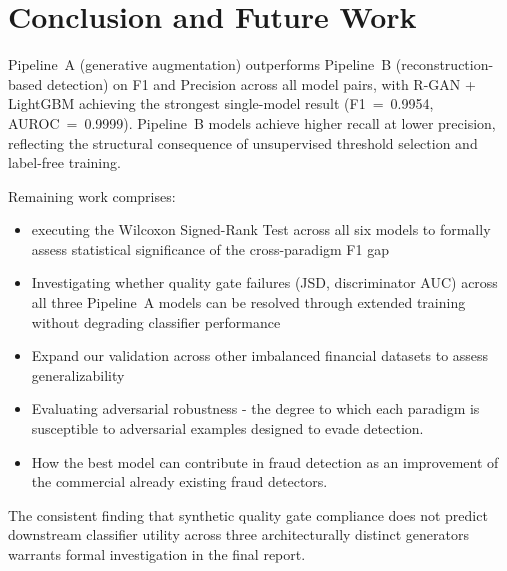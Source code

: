 \documentclass[conference]{IEEEtran}
\begin{document}
\section{Conclusion and Future Work}

Pipeline~A (generative
augmentation) outperforms Pipeline~B (reconstruction-based detection)
on F1 and Precision across all model pairs, with R-GAN + LightGBM
achieving the strongest single-model result (F1~=~0.9954, AUROC~=~0.9999).
Pipeline~B models achieve higher recall at lower precision, reflecting
the structural consequence of unsupervised threshold selection and
label-free training.

\noindent Remaining work comprises:
\begin{itemize}
    \item[-] executing the Wilcoxon Signed-Rank Test
across all six models to formally assess statistical significance of
the cross-paradigm F1 gap
\item[-] Investigating whether quality gate
failures (JSD, discriminator AUC) across all three Pipeline~A models
can be resolved through extended training without degrading classifier
performance
\item[-] Expand our validation across other imbalanced financial datasets to assess generalizability 
\item[-] Evaluating adversarial robustness - the degree
to which each paradigm is susceptible to adversarial examples designed
to evade detection.
\item[-] How the best model can contribute in fraud detection as an improvement of the commercial already existing fraud detectors.
\end{itemize}
\noident The consistent finding that synthetic quality gate compliance does not
predict downstream classifier utility across three architecturally
distinct generators warrants formal investigation in the final report.



\end{document}
